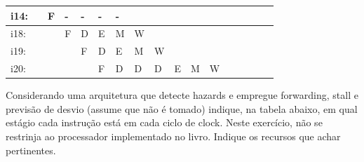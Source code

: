 \documentclass{article}
\begin{document}
\begin{table}[H]
\begin{tabular}{|l|l|l|l|l|l|l|l|l|l|l|l|l|l|l|l|l|}
i14: &     &  F  &  -  &  -  &  -  &  -  &     &     &     &     &     &     &     &     &     &     \\ \hline
i18: &     &     &  F  &  D  &  E  &  M  &  W  &     &     &     &     &     &     &     &     &     \\ \hline
i19: &     &     &     &  F  &  D  &  E  &  M  &  W  &     &     &     &     &     &     &     &     \\ \hline
i20: &     &     &     &     &  F  &  D  &  D  &  D  &  E  &  M  &  W  &     &     &     &     &     \\ \hline
\end{tabular}
\end{table}


\pagebreak

{\large Considerando uma arquitetura que detecte hazards e empregue forwarding, stall e previsão de desvio (assume que não é tomado) indique, na tabela abaixo, em qual estágio cada instrução está em cada ciclo de clock. Neste exercício, não se restrinja ao processador implementado no livro. Indique os recursos que achar pertinentes.}
\end{document}
